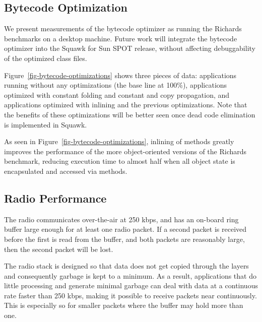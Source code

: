 \documentclass{sigplanconf}
\newcommand{\doublepsfigbegin}[2]{\begin{figure*}[htp] \centerline{\psfig{figure={#1},height={#2}}} }
\newcommand{\doublepsfigend}[2]{{\small \bf \caption{\label{#1} {#2}}} \end{figure*} }
\begin{document}
\subsection{Bytecode Optimization}

We present measurements of the bytecode optimizer as running the
Richards benchmarks on a desktop machine.  
Future work will integrate the bytecode optimizer into the Squawk 
for Sun SPOT release, without affecting debuggability of the optimized 
class files. 

\doublepsfigbegin{results-bytecode-optm.eps}{8cm}
\doublepsfigend{fig-bytecode-optimizations}{Results of Performing Bytecode Optimizations 
on the Richards Benchmarks}

Figure~\ref{fig-bytecode-optimizations} shows three pieces of data: 
applications running without any optimizations (the base line at 100\%), 
applications optimized with constant folding and constant and copy propagation,
and applications optimized with inlining and the previous optimizations. 
Note that the benefits of these optimizations will be better seen once
dead code elimination is implemented in Squawk. 

As seen in Figure~\ref{fig-bytecode-optimizations}, inlining of methods 
greatly improves the performance of the more object-oriented versions of
the Richards benchmark, reducing execution time to almost half when 
all object state is encapsulated and accessed via methods.  



\subsection{Radio Performance}
\label{sec-radio-performance}

The radio communicates over-the-air at 250 kbps, and has an on-board
ring buffer large enough for at least one radio packet. If a second
packet is received before the first is read from the buffer, and both
packets are reasonably large, then the second packet will be lost.

The radio stack is designed so that data does not get copied through
the layers and consequently garbage is kept to a minimum. As a result,
applications that do little processing and generate minimal garbage
can deal with data at a continuous rate faster than 250 kbps, making
it possible to receive packets near continuously. This is especially
so for smaller packets where the buffer may hold more than one.
\end{document}
